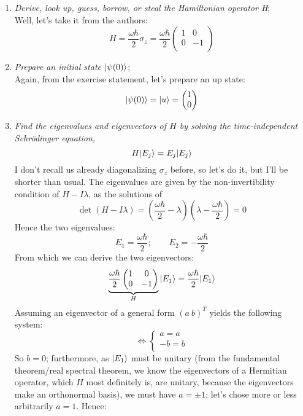 \documentclass[solutions.tex]{subfiles}
\begin{document}
\begin{enumerate}
	\item \textit{Derive, look up, guess, borrow, or steal the Hamiltonian
	operator H}; \\
	Well, let's take it from the authors:
	\[
		H = \frac{\omega\hbar}2\sigma_z = \frac{\omega\hbar}2\begin{pmatrix}
			1 &  0 \\
			0 & -1 \\
		\end{pmatrix}
	\]
	\item \textit{Prepare an initial state $|\psi(0)\rangle$}; \\
	Again, from the exercise statement, let's prepare an up state:
	\[
		|\psi(0)\rangle = |u\rangle = \begin{pmatrix} 1 \\ 0 \\ \end{pmatrix}
	\]
	\item \textit{Find the eigenvalues and eigenvectors of $H$ by solving
	the time-independent Schr\"odinger equation,
	\[
		H|E_j\rangle = E_j|E_j\rangle
	\]}
	I don't recall us already diagonalizing $\sigma_z$ before, so
	let's do it, but I'll be shorter than usual. The eigenvalues
	are given by the non-invertibility condition of $H-I\lambda$,
	as the solutions of
	\[
		\det(H-I\lambda) =
			(\frac{\omega\hbar}2-\lambda)(\lambda-\frac{\omega\hbar}2) = 0
	\]
	Hence the two eigenvalues:
	\[
		E_1 = \frac{\omega\hbar}2;\qquad E_2 = -\frac{\omega\hbar}2
	\]
	From which we can derive the two eigenvectors:
	\[
		\underbrace{\frac{\omega\hbar}2\begin{pmatrix}
			1 & 0  \\
			0 & -1 \\
		\end{pmatrix}}_{H}|E_1\rangle = \frac{\omega\hbar}2|E_1\rangle
	\]
	Assuming an eigenvector of a general form $(a\ b)^T$ yields
	the following system:
	\[
		\Leftrightarrow \begin{cases}
			a = a \\
			-b = b \\
		\end{cases}
	\]
	So $b = 0$; furthermore, as $|E_1\rangle$ must be unitary
	(from the fundamental theorem/real spectral theorem, we know
	the eigenvectors of a Hermitian operator, which $H$ most definitely
	is, are unitary, because the eigenvectors make an orthonormal basis),
	we must have $a = \pm 1$; let's chose more or
	less arbitrarily $a = 1$. Hence:
	\[
\]
\end{enumerate}
\end{document}
